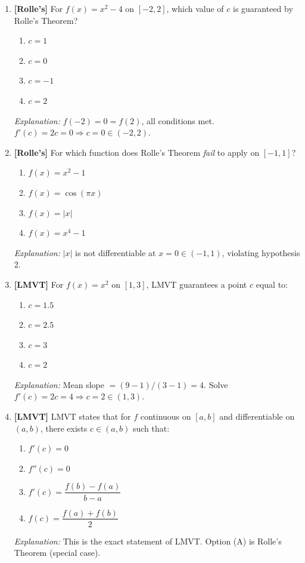 \documentclass[12pt,a4paper]{article}
\begin{document}
\begin{enumerate}
  \item \textbf{[Rolle's]} For $f(x) = x^2 - 4$ on $[-2, 2]$, which value of $c$ is guaranteed
        by Rolle's Theorem?
        \begin{enumerate}[label=(\Alph*)]
          \item $c = 1$
          \item \textbf{$c = 0$}
          \item $c = -1$
          \item $c = 2$
        \end{enumerate}
        \textit{Explanation:} $f(-2) = 0 = f(2)$, all conditions met. $f'(c) = 2c = 0 \Rightarrow c = 0 \in (-2,2)$.

  \item \textbf{[Rolle's]} For which function does Rolle's Theorem \emph{fail} to apply on $[-1, 1]$?
        \begin{enumerate}[label=(\Alph*)]
          \item $f(x) = x^2 - 1$
          \item $f(x) = \cos(\pi x)$
          \item \textbf{$f(x) = |x|$}
          \item $f(x) = x^4 - 1$
        \end{enumerate}
        \textit{Explanation:} $|x|$ is not differentiable at $x=0 \in (-1,1)$, violating hypothesis 2.

  \item \textbf{[LMVT]} For $f(x) = x^2$ on $[1, 3]$, LMVT guarantees a point $c$ equal to:
        \begin{enumerate}[label=(\Alph*)]
          \item $c = 1.5$
          \item $c = 2.5$
          \item $c = 3$
          \item \textbf{$c = 2$}
        \end{enumerate}
        \textit{Explanation:} Mean slope $= (9-1)/(3-1) = 4$. Solve $f'(c)=2c=4 \Rightarrow c=2 \in (1,3)$.

  \item \textbf{[LMVT]} LMVT states that for $f$ continuous on $[a,b]$ and differentiable on $(a,b)$,
        there exists $c \in (a,b)$ such that:
        \begin{enumerate}[label=(\Alph*)]
          \item $f'(c) = 0$
          \item $f''(c) = 0$
          \item \textbf{$f'(c) = \dfrac{f(b)-f(a)}{b-a}$}
          \item $f(c) = \dfrac{f(a)+f(b)}{2}$
        \end{enumerate}
        \textit{Explanation:} This is the exact statement of LMVT. Option (A) is Rolle's Theorem (special case).


\end{enumerate}
\end{document}
